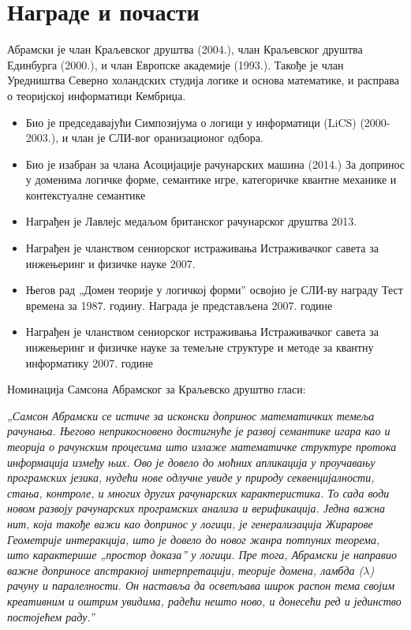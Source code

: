 \documentclass[a4paper]{article}
\begin{document}
\section{Награде и почасти}
Абрамски је члан Краљевског друштва (2004.), члан Краљевског друштва Единбурга (2000.),\cite{saf} и члан Европске академије (1993.). Такође је члан Уредништва Северно холандских студија логике и основа математике, и расправа о теоријској информатици Кембриџа. 
\begin{itemize}
\item    Био је председавајући Симпозијума о логици у информатици (LiCS) (2000- 2003.), и члан је СЛИ-вог оранизационог одбора.

\item    Био је изабран за члана Асоцијације рачунарских машина (2014.) За допринос у доменима логичке форме, семантике игре, категоричке квантне механике и контекстуалне семантике
\item    Награђен је Лавлејс медаљом британског рачунарског друштва 2013.\cite{sat}
\item    Награђен је чланством сениорског истраживања Истраживачког савета за инжењеринг и физичке науке 2007.
\item    Његов рад „Домен теорије у логичкој форми” освојио је СЛИ-ву награду Тест времена за 1987. годину. Награда је представљена 2007. године
\item    Награђен је чланством сениорског истраживања Истраживачког савета за инжењеринг и физичке науке за темељне структуре и методе за квантну информатику 2007. године
\end{itemize}

\newpage
Номинација Самсона Абрамског за Краљевско друштво гласи:\\

\begin{addmargin}{2em}
\emph{„Самсон Абрамски се истиче за исконски допринос математичких темеља рачунања. Његово неприкосновено достигнуће је развој семантике игара као и теорија о рачунским процесима што излаже математичке структуре протока информација између њих. Ово је довело до моћних апликација у проучавању програмских језика, нудећи нове одлучне увиде у природу секвенцијалности, стања, контроле, и многих других рачунарских карактеристика. То сада води новом развоју рачунарских програмских анализа и верификација. Једна важна нит, која такође важи као допринос у логици, је генерализација Жирарове Геометрије интеракција, што је довело до новог жанра потпуних теорема, што карактерише „простор доказа” у логици. Пре тога, Абрамски је направио важне доприносе апстракној интерпретацији, теорије домена, ламбда ($\lambda$) рачуну и паралелности. Он наставља да осветљава широк распон тема својим креативним и оштрим увидима, радећи нешто ново, и донесећи ред и јединство постојећем раду.”}
\end{addmargin}
\end{document}
